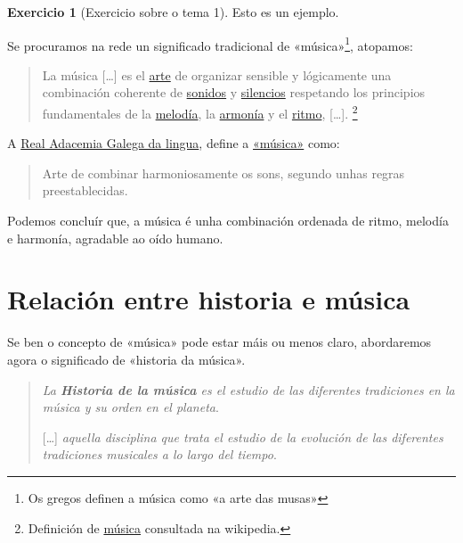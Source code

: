 \documentclass[a4paper, twoside]{templates/ociamthesis}
\theoremstyle{definition}
\theoremstyle{definition}
\theoremstyle{definition}
\newtheorem{exercise}{Exercicio}[chapter]
\theoremstyle{definition}
\theoremstyle{remark}
\begin{document}
\begin{exercise}[Exercicio sobre o tema 1]
\label{exr:exercicio1} {} Esto es un ejemplo.
\end{exercise}

Se procuramos na rede un significado tradicional de «música»\footnote{Os gregos definen a música como «a arte das musas»}, atopamos:

\begin{quote}
La música {[}\ldots{]} es el \href{https://es.wikipedia.org/wiki/Arte}{arte} de organizar sensible y lógicamente una combinación coherente de \href{https://es.wikipedia.org/wiki/Sonido}{sonidos} y \href{https://es.wikipedia.org/wiki/Silencio_(sonido)}{silencios} respetando los principios fundamentales de la \href{https://es.wikipedia.org/wiki/Melodía}{melodía}, la \href{https://es.wikipedia.org/wiki/Armonía}{armonía} y el \href{https://es.wikipedia.org/wiki/Ritmo}{ritmo}, {[}\ldots{]}. \footnote{Definición de \href{https://es.wikipedia.org/wiki/M\%C3\%BAsica\#Definici\%C3\%B3n}{música} consultada na wikipedia.}
\end{quote}

A \href{https://academia.gal/dicionario}{Real Adacemia Galega da lingua}, define a \href{https://digalego.xunta.gal/es/termo/44501/m\%C3\%BAsica}{«música»} como:

\begin{quote}
Arte de combinar harmoniosamente os sons, segundo unhas regras preestablecidas.
\end{quote}

\begin{correction}
Podemos concluír que, a música é unha combinación ordenada de ritmo,
melodía e harmonía, agradable ao oído humano.
\end{correction}

\hypertarget{relaciuxf3n-entre-historia-e-muxfasica}{%
\section*{Relación entre historia e música}\label{relaciuxf3n-entre-historia-e-muxfasica}}

Se ben o concepto de «música» pode estar máis ou menos claro, abordaremos agora o significado de «historia da música».

\begin{quote}
\emph{La \textbf{Historia de la música} es el estudio de las diferentes tradiciones en la música y su orden en el planeta}.

{[}\ldots{]} \emph{aquella disciplina que trata el estudio de la evolución de las diferentes tradiciones musicales a lo largo del tiempo}.
\end{quote}
\end{document}
